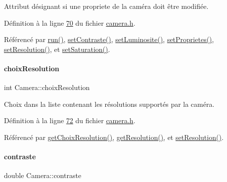 Attribut désignant si une propriete de la caméra doit être modifiée. 



Définition à la ligne \hyperlink{camera_8h_source_l00070}{70} du fichier \hyperlink{camera_8h_source}{camera.\+h}.



Référencé par \hyperlink{camera_8cpp_source_l00068}{run()}, \hyperlink{camera_8cpp_source_l00258}{set\+Contraste()}, \hyperlink{camera_8cpp_source_l00252}{set\+Luminosite()}, \hyperlink{camera_8cpp_source_l00108}{set\+Proprietes()}, \hyperlink{camera_8cpp_source_l00186}{set\+Resolution()}, et \hyperlink{camera_8cpp_source_l00264}{set\+Saturation()}.

\mbox{\label{class_camera_a3fdddf6f548f04d7bdc26f32602a03d4}} 
\paragraph{\texorpdfstring{choix\+Resolution}{choixResolution}}
{\footnotesize\ttfamily int Camera\+::choix\+Resolution\hspace{0.3cm}{\ttfamily [private]}}



Choix dans la liste contenant les résolutions supportés par la caméra. 



Définition à la ligne \hyperlink{camera_8h_source_l00072}{72} du fichier \hyperlink{camera_8h_source}{camera.\+h}.



Référencé par \hyperlink{camera_8cpp_source_l00128}{get\+Choix\+Resolution()}, \hyperlink{camera_8cpp_source_l00121}{get\+Resolution()}, et \hyperlink{camera_8cpp_source_l00186}{set\+Resolution()}.

\mbox{\label{class_camera_ad3b300e52c91341d985d3b54f562a0f7}} 
\paragraph{\texorpdfstring{contraste}{contraste}}
{\footnotesize\ttfamily double Camera\+::contraste\hspace{0.3cm}{\ttfamily [private]}}



